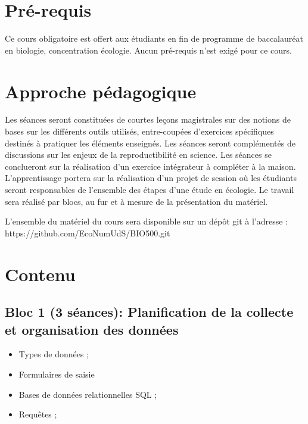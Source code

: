 \documentclass[12]{article}
\begin{document}
	\section*{Pré-requis}

	Ce cours obligatoire est offert aux étudiants en fin de programme de
	baccalauréat en biologie, concentration écologie. Aucun pré-requis n'est
	exigé pour ce cours. 


    \section*{Approche pédagogique} 

Les séances seront constituées de courtes leçons magistrales sur des notions
de bases sur les différents outils utilisés, entre-coupées d'exercices
spécifiques destinés à pratiquer les éléments enseignés. Les séances seront
complémentés de discussions sur les enjeux de la reproductibilité en science.
Les séances se conclueront sur la réalisation  d'un exercice intégrateur à
compléter à la maison. L'apprentissage portera sur la réalisation d'un projet
de session où les étudiants seront responsables de l'ensemble des étapes d'une
étude en écologie. Le travail sera réalisé par blocs, au fur et à mesure de la
présentation du matériel.


	L'ensemble du matériel du cours sera disponible sur un dépôt git à l'adresse :\\
	https://github.com/EcoNumUdS/BIO500.git

	\section*{Contenu}

	\subsection*{Bloc 1 (3 séances): Planification de la collecte et organisation des données}

	\begin{itemize}
	\renewcommand{\labelitemi}{$\bullet$}	
		\item Types de données ;
		\item Formulaires de saisie
		\item Bases de données relationnelles SQL ;
		\item Requêtes ;
	\end{itemize}
\end{document}
